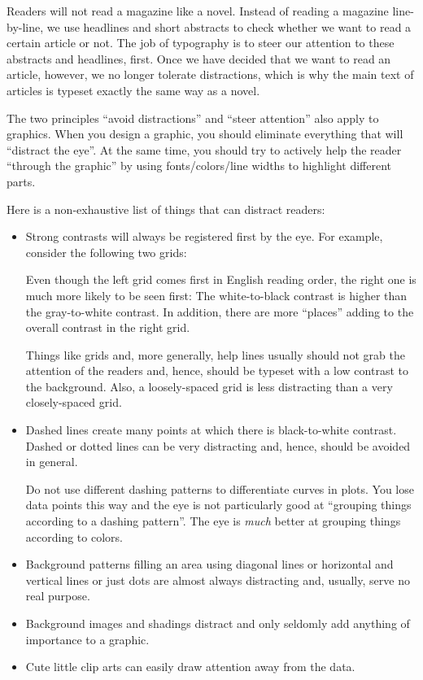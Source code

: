 Readers will not read a magazine like a novel. Instead of reading a magazine
line-by-line, we use headlines and short abstracts to check whether we want to
read a certain article or not. The job of typography is to steer our attention
to these abstracts and headlines, first. Once we have decided that we want to
read an article, however, we no longer tolerate distractions, which is why the
main text of articles is typeset exactly the same way as a novel.

The two principles ``avoid distractions'' and ``steer attention'' also apply to
graphics. When you design a graphic, you should eliminate everything that will
``distract the eye''. At the same time, you should try to actively help the
reader ``through the graphic'' by using fonts/colors/line widths to highlight
different parts.

Here is a non-exhaustive list of things that can distract readers:
%
\begin{itemize}
    \item Strong contrasts will always be registered first by the eye. For
        example, consider the following two grids:

        \medskip\par

        \medskip
        Even though the left grid comes first in English reading order, the
        right one is much more likely to be seen first: The white-to-black
        contrast is higher than the gray-to-white contrast. In addition,
        there are more ``places'' adding to the overall contrast in the right
        grid.

        Things like grids and, more generally, help lines usually should not
        grab the attention of the readers and, hence, should be typeset with
        a low contrast to the background. Also, a loosely-spaced grid is less
        distracting than a very closely-spaced grid.
    \item Dashed lines create many points at which there is black-to-white
        contrast. Dashed or dotted lines can be very distracting and, hence,
        should be avoided in general.

        Do not use different dashing patterns to differentiate curves in
        plots. You lose data points this way and the eye is not particularly
        good at ``grouping things according to a dashing pattern''. The eye
        is \emph{much} better at grouping things according to colors.
    \item Background patterns filling an area using diagonal lines or
        horizontal and vertical lines or just dots are almost always
        distracting and, usually, serve no real purpose.
    \item Background images and shadings distract and only seldomly add
        anything of importance to a graphic.
    \item Cute little clip arts can easily draw attention away from the data.
\end{itemize}
